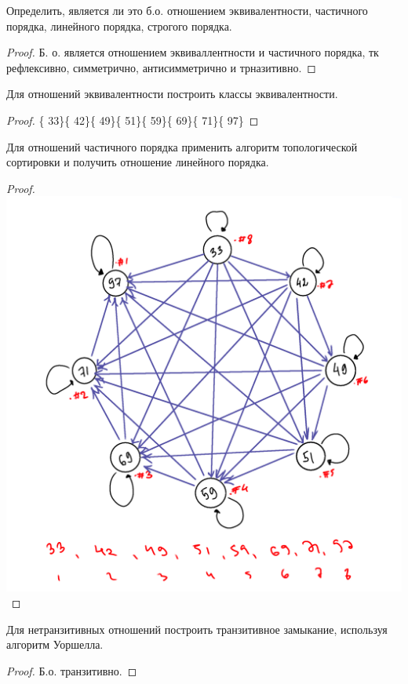 \begin{problem}
	Определить, является ли это б.о. отношением эквивалентности, частичного порядка, линейного порядка, строгого порядка.
\end{problem}

\begin{proof}
	Б. о. является отношением эквиваллентности и частичного порядка, тк рефлексивно, симметрично, антисимметрично и трназитивно.
\end{proof}
\begin{problem}
	Для отношений эквивалентности построить классы эквивалентности.
\end{problem}

\begin{proof}
    \{ 33\}\{ 42\}\{ 49\}\{ 51\}\{ 59\}\{ 69\}\{ 71\}\{ 97\}
\end{proof}
\begin{problem}
	Для отношений частичного порядка применить алгоритм топологической сортировки и получить отношение линейного порядка.
\end{problem}

\begin{proof}
    \includegraphics{сортировка2.png}
\end{proof}
\begin{problem}
	Для нетранзитивных отношений построить транзитивное замыкание, используя алгоритм Уоршелла.
\end{problem}

\begin{proof}
Б.о. транзитивно.
\end{proof}